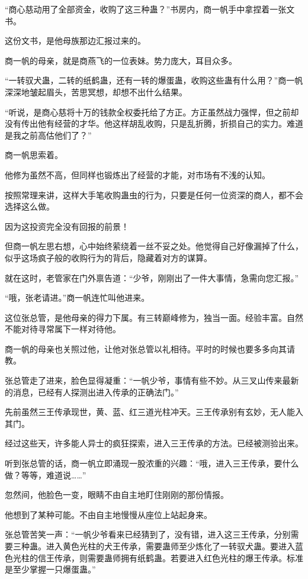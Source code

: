 
\begin{this_body}

“商心慈动用了全部资金，收购了这三种蛊？”书房内，商一帆手中拿捏着一张文书。

这份文书，是他母族那边汇报过来的。

商一帆的母亲，就是商燕飞的一位表妹。势力庞大，耳目众多。

“一转驭犬蛊，二转的纸鹤蛊，还有一转的爆蛋蛊，收购这些蛊有什么用？”商一帆深深地皱起眉头，苦思冥想，却想不出什么结果。

“听说，是商心慈将十万的钱款全权委托给了方正。方正虽然战力强悍，但之前却没有传出他有经营的才华。他这样胡乱收购，只是乱折腾，折损自己的实力。难道是我之前高估他们了？”

商一帆思索着。

他修为虽然不高，但同样也锻炼出了经营的才能，对市场有不浅的认知。

按照常理来讲，这样大手笔收购蛊虫的行为，只要是任何一位资深的商人，都不会选择这么做。

因为这投资完全没有回报的前景！

但商一帆左思右想，心中始终萦绕着一丝不妥之处。他觉得自己好像漏掉了什么，似乎这场疯子般的收购行为的背后，隐藏着对方的谋算。

就在这时，老管家在门外禀告道：“少爷，刚刚出了一件大事情，急需向您汇报。”

“哦，张老请进。”商一帆连忙叫他进来。

这位张总管，是他母亲的得力下属。有三转巅峰修为，独当一面。经验丰富。自然不能对待寻常属下一样对待他。

商一帆的母亲也关照过他，让他对张总管以礼相待。平时的时候也要多多向其请教。

张总管走了进来，脸色显得凝重：“一帆少爷，事情有些不妙。从三叉山传来最新的消息，已经有人探测出进入传承的正确法门。”

先前虽然三王传承现世，黄、蓝、红三道光柱冲天。三王传承别有玄妙，无人能入其门。

经过这些天，许多能人异士的疯狂探索，进入三王传承的方法。已经被测验出来。

听到张总管的话，商一帆立即涌现一股浓重的兴趣：“哦，进入三王传承，要什么做？等等，难道说……”

忽然间，他脸色一变，眼睛不由自主地盯住刚刚的那份情报。

他想到了某种可能。不由自主地慢慢从座位上站起身来。

张总管苦笑一声：“一帆少爷看来已经猜到了，没有错，进入这三王传承，分别需要三种蛊。进入黄色光柱的犬王传承，需要蛊师至少炼化了一转驭犬蛊。要进入蓝色光柱的信王传承，则需要蛊师拥有纸鹤蛊。若要进入红色光柱的爆王传承。标准是至少掌握一只爆蛋蛊。”


\end{this_body}
